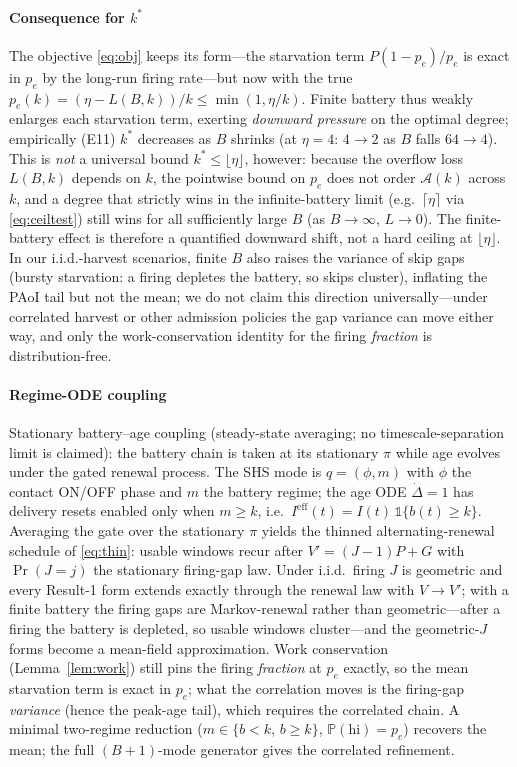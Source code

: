 \documentclass[twocolumn,3p,times,procedia]{elsarticle}
\newcommand{\AoI}{\Delta}
\newcommand{\Prob}{\mathbb{P}}
\newcommand{\ind}{\mathbb{1}}
\newcommand{\peff}{p_e}
\newcommand{\kstar}{k^{\ast}}
\begin{document}
\paragraph*{Consequence for $\kstar$}
The objective \eqref{eq:obj} keeps its form---the starvation term
$P(1-\peff)/\peff$ is exact in $\peff$ by the long-run firing
rate---but now with
the true $\peff(k)=(\eta-L(B,k))/k\le\min(1,\eta/k)$. Finite battery thus
weakly enlarges each starvation term, exerting \emph{downward pressure} on
the optimal degree; empirically (E11) $\kstar$
decreases as $B$ shrinks (at $\eta{=}4$: $4\to2$ as $B$ falls
$64\to4$). This is \emph{not} a universal bound
$\kstar\le\lfloor\eta\rfloor$, however: because the overflow loss
$L(B,k)$ depends on $k$, the pointwise bound on $\peff$ does not order
$\mathcal{A}(k)$ across $k$, and a degree that strictly wins in the
infinite-battery limit (e.g.\ $\lceil\eta\rceil$ via \eqref{eq:ceiltest})
still wins for all sufficiently large $B$ (as $B\to\infty$, $L\to0$). The
finite-battery effect is therefore a quantified downward shift, not a hard
ceiling at $\lfloor\eta\rfloor$. In our i.i.d.-harvest scenarios, finite
$B$ also raises the variance of skip gaps (bursty starvation: a firing
depletes the battery, so skips cluster), inflating the PAoI tail but not
the mean; we do not claim this direction universally---under correlated
harvest or other admission policies the gap variance can move either
way, and only the work-conservation identity for the firing
\emph{fraction} is distribution-free.

\paragraph*{Regime-ODE coupling}
Stationary battery--age coupling (steady-state averaging; no
timescale-separation limit is claimed): the battery chain is taken at
its stationary $\pi$ while age evolves under the gated renewal
process. The SHS
mode is $q=(\phi,m)$ with $\phi$ the contact ON/OFF phase and $m$ the
battery regime; the age ODE $\dot\AoI=1$ has delivery resets enabled only
when $m\ge k$, i.e.\ $I^{\mathrm{eff}}(t)=I(t)\,\ind\{b(t)\ge k\}$.
Averaging the gate over the stationary $\pi$ yields the thinned
alternating-renewal schedule of \eqref{eq:thin}: usable windows recur
after $V'=(J{-}1)P+G$ with $\Pr(J{=}j)$ the stationary firing-gap law.
Under i.i.d.\ firing $J$ is geometric and every Result-1 form extends
exactly through the renewal law with $V\to V'$; with a finite battery
the firing gaps are Markov-renewal rather than geometric---after a
firing the battery is depleted, so usable windows cluster---and the
geometric-$J$ forms become a mean-field approximation. Work conservation
(Lemma~\ref{lem:work}) still pins the firing \emph{fraction} at $\peff$
exactly, so the mean starvation term is exact in $\peff$; what the
correlation moves is the firing-gap \emph{variance} (hence the peak-age
tail), which requires the correlated chain. A minimal two-regime
reduction ($m\in\{b<k,\,b\ge k\}$, $\Prob(\text{hi})=\peff$) recovers the
mean; the full $(B{+}1)$-mode generator gives the correlated refinement.
\end{document}
